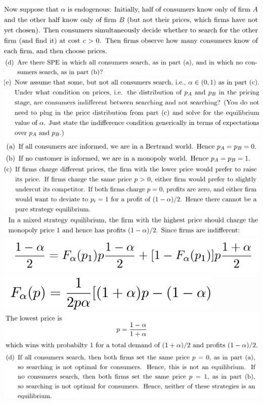 \documentclass[8pt,landscape]{extarticle}
\begin{document}
\begin{multicols*}{3}
    \includegraphics[width=0.7\linewidth,keepaspectratio]{Screenshots/Screenshot 2024-03-11 170507.png}
    \includegraphics[width=0.74\linewidth,keepaspectratio]{Screenshots/Screenshot 2024-03-11 170511.png}
    \includegraphics[width=0.73\linewidth,keepaspectratio]{Screenshots/Screenshot 2024-03-11 170524.png}
    \includegraphics[width=0.71\linewidth,keepaspectratio]{Screenshots/Screenshot 2024-03-11 170533.png}
    \includegraphics[width=0.74\linewidth,keepaspectratio]{Screenshots/Screenshot 2024-03-11 170540.png}
    \includegraphics[width=0.71\linewidth,keepaspectratio]{Screenshots/Screenshot 2024-03-11 170544.png}
    \includegraphics[width=0.39\linewidth,keepaspectratio]{Screenshots/Screenshot 2024-03-11 170548.png}
    \includegraphics[width=0.27\linewidth,keepaspectratio]{Screenshots/Screenshot 2024-03-11 170551.png}
    \includegraphics[width=0.7\linewidth,keepaspectratio]{Screenshots/Screenshot 2024-03-11 170557.png}
    \includegraphics[width=0.75\linewidth,keepaspectratio]{Screenshots/Screenshot 2024-03-11 170617.png}

\end{multicols*}
\end{document}
